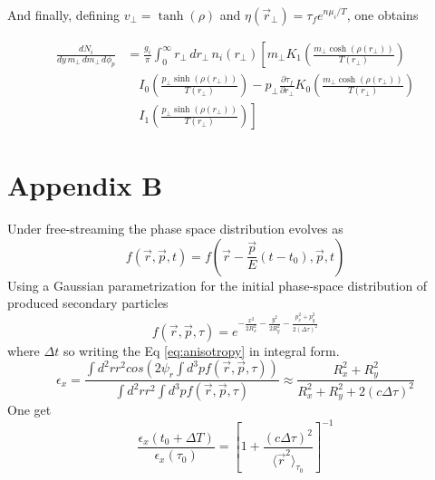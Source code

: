 \documentclass[12pt,a4paper]{book}
\begin{document}
	And finally, defining \( v_\perp = \tanh(\rho) \) and \( \eta(\vec{r}_\perp) = \tau_f e^{n \mu_i / T} \), one obtains
	
	\begin{equation}
		\begin{aligned}
			\frac{dN_i}{dy \, m_\perp \, dm_\perp \, d\phi_p} &= \frac{g_i}{\pi} \int_{0}^{\infty} r_\perp \, dr_\perp \, n_i(r_\perp) \left[ m_\perp K_1 \left( \frac{m_\perp \cosh(\rho(r_\perp))}{T(r_\perp)}\right) \right. \\
			& \quad \left. I_0 \left( \frac{p_\perp \sinh(\rho(r_\perp))}{T(r_\perp)} \right) - p_\perp \frac{\partial \tau_f}{\partial r_\perp} K_0 \left( \frac{m_\perp \cosh(\rho(r_\perp))}{T(r_\perp)}\right) \right. \\
			& \quad \left. I_1 \left( \frac{p_\perp \sinh(\rho(r_\perp))}{T(r_\perp)} \right) \right]
		\end{aligned}
		\label{eq:momentum_cooper-frye_a}
	\end{equation}
	
	\section{Appendix B} \label{app:B}
	Under free-streaming the phase space distribution evolves as
	\begin{equation}
		f(\vec{r},\vec{p}, t) = f(\vec{r} - \frac{\vec{p}}{E}(t-t_0), \vec{p}, t) 
	\end{equation}
	Using a Gaussian parametrization for the initial phase-space distribution of produced secondary particles
	\begin{equation}
		f(\vec{r},\vec{p}, \tau) =e^{- \frac{x^2}{2 R_x^2} - \frac{y^2}{2 R_y^2}- \frac{p_x^2+ p_y^2}{2 (\Delta \tau)^2}}
	\end{equation}
	where $\Delta t$ so writing the Eq \ref{eq:anisotropy} in integral form.
	\begin{equation}
		\epsilon_x = \frac{\int d^2 r r^2 cos(2 \psi_r \int d^3 p f(\vec{r},\vec{p}, \tau))}{\int d^2 r r^2  \int d^3 p f(\vec{r},\vec{p}, \tau)} \approx \frac{R_x^2 +R_y^2}{R_x^2 +R_y^2 + 2(c \Delta \tau)^2}
	\end{equation}
	One get
	\begin{equation}
		\frac{\epsilon_x(t_0 + \Delta T)}{\epsilon_x(\tau_0)} = \left[ 1 + \frac{(c \Delta \tau)^2}{\langle \vec{r}^2 \rangle_{\tau_0}} \right]^{-1}
	\end{equation}
	
\end{document}
